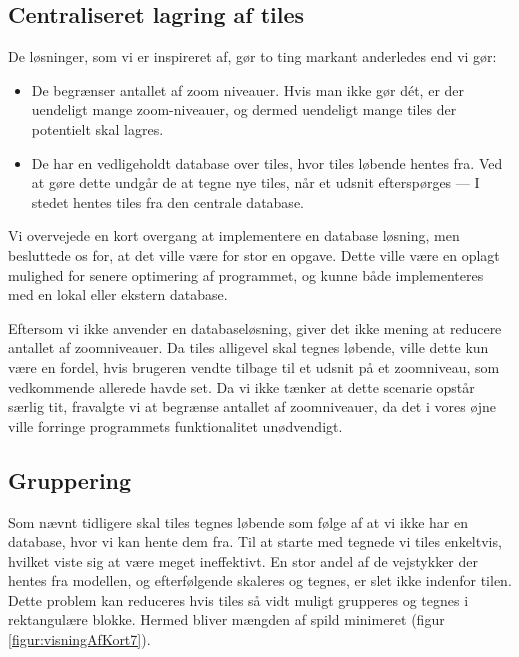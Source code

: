\subsection{Centraliseret lagring af tiles}
\label{subsec:centraliseretLagringAfTiles}

De løsninger, som vi er inspireret af, gør to ting markant anderledes end vi gør:

\begin{itemize}
	\item De begrænser antallet af zoom niveauer. Hvis man ikke gør dét, er der uendeligt mange zoom-niveauer, og dermed uendeligt mange tiles der potentielt skal lagres.
	\item De har en vedligeholdt database over tiles, hvor tiles løbende hentes fra. Ved at gøre dette undgår de at tegne nye tiles, når et udsnit efterspørges --- I stedet hentes tiles fra den centrale database.
\end{itemize}

Vi overvejede en kort overgang at implementere en database løsning, men besluttede os for, at det ville være for stor en opgave. Dette ville være en oplagt mulighed for senere optimering af programmet, og kunne både implementeres med en lokal eller ekstern database.

Eftersom vi ikke anvender en databaseløsning, giver det ikke mening at reducere antallet af zoomniveauer. Da tiles alligevel skal tegnes løbende, ville dette kun være en fordel, hvis brugeren vendte tilbage til et udsnit på et zoomniveau, som vedkommende allerede havde set. Da vi ikke tænker at dette scenarie opstår særlig tit, fravalgte vi at begrænse antallet af zoomniveauer, da det i vores øjne ville forringe programmets funktionalitet unødvendigt.

\subsection{Gruppering}
\label{subsec:gruppering}

Som nævnt tidligere skal tiles tegnes løbende som følge af at vi ikke har en database, hvor vi kan hente dem fra. Til at starte med tegnede vi tiles enkeltvis, hvilket viste sig at være meget ineffektivt. En stor andel af de vejstykker der hentes fra modellen, og efterfølgende skaleres og tegnes, er slet ikke indenfor tilen. Dette problem kan reduceres hvis tiles så vidt muligt grupperes og tegnes i rektangulære blokke. Hermed bliver mængden af spild minimeret (figur \ref{figur:visningAfKort7}).

